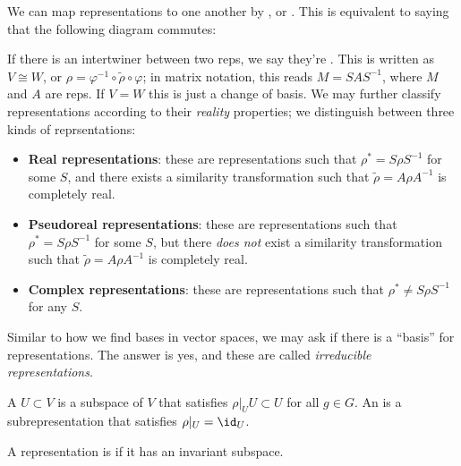 \documentclass[11pt]{article}
\begin{document}
We can map representations to one another by , or . This is equivalent to
saying that the following diagram commutes:
\begin{center}
\end{center}
If there is an intertwiner between two reps, we say they're 
. This is written as $V \cong W$, or 
$\rho = \varphi^{-1} \circ \widetilde{\rho} \circ \varphi$;
in matrix notation, this reads $M = S A S^{-1}$, where $M$ and $A$ are reps.
If $V = W$ this is just a change of basis. We may further classify
representations according to their \emph{reality} properties; we
distinguish between three kinds of reprsentations:
\begin{itemize}
    \item \textbf{Real representations}: these are representations
    such that $\rho^* = S \rho S^{-1}$ for some $S$, and there exists
    a similarity transformation such that $\widetilde{\rho}= A \rho A^{-1}$ is
    completely real.
    \item \textbf{Pseudoreal representations}: these are representations
    such that $\rho^* = S \rho S^{-1}$ for some $S$, but there \emph{does not}
    exist a similarity transformation such that $\widetilde{\rho}= A \rho A^{-1}$ is
    completely real. 
    \item \textbf{Complex representations}: these are representations
    such that $\rho^* \neq S \rho S^{-1}$ for any $S$.
\end{itemize}

Similar to how we find bases in vector spaces, we may ask if there is a 
``basis'' for representations. The answer is yes, and these are called 
\emph{irreducible representations}.

\begin{definition}
    A  $U \subset V$ is a subspace
    of $V$ that satisfies $\rho|_U U \subset U$ for all $g \in G$.
    An  is a subrepresentation that
    satisfies $\rho|_U = \id_U$.
\end{definition}

\begin{definition}
    A representation is  if it has an invariant subspace.
\end{definition}
\end{document}
